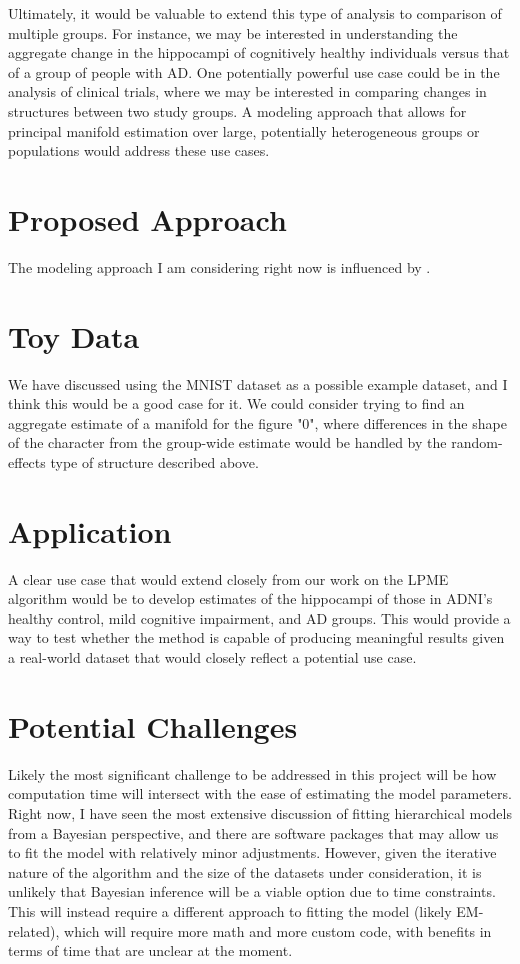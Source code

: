 \documentclass[11pt, reqno]{article}
\begin{document}
Ultimately, it would be valuable to extend this type of analysis to comparison of multiple groups. For instance, we may be interested in understanding the aggregate change in the hippocampi of cognitively healthy individuals versus that of a group of people with AD. One potentially powerful use case could be in the analysis of clinical trials, where we may be interested in comparing changes in structures between two study groups. A modeling approach that allows for principal manifold estimation over large, potentially heterogeneous groups or populations would address these use cases.

\section{Proposed Approach}

The modeling approach I am considering right now is influenced by \cite{schulamIntegrativeAnalysisUsing2016}.

\section{Toy Data}

We have discussed using the MNIST dataset as a possible example dataset, and I think this would be a good case for it. We could consider trying to find an aggregate estimate of a manifold for the figure "0", where differences in the shape of the character from the group-wide estimate would be handled by the random-effects type of structure described above. 

\section{Application}

A clear use case that would extend closely from our work on the LPME algorithm would be to develop estimates of the hippocampi of those in ADNI's healthy control, mild cognitive impairment, and AD groups. This would provide a way to test whether the method is capable of producing meaningful results given a real-world dataset that would closely reflect a potential use case.

\section{Potential Challenges}

Likely the most significant challenge to be addressed in this project will be how computation time will intersect with the ease of estimating the model parameters. Right now, I have seen the most extensive discussion of fitting hierarchical models from a Bayesian perspective, and there are software packages that may allow us to fit the model with relatively minor adjustments. However, given the iterative nature of the algorithm and the size of the datasets under consideration, it is unlikely that Bayesian inference will be a viable option due to time constraints. This will instead require a different approach to fitting the model (likely EM-related), which will require more math and more custom code, with benefits in terms of time that are unclear at the moment.
\end{document}
